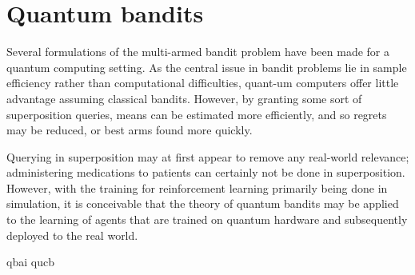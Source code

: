 \chapter{Quantum bandits}
\label{chap:qbandits}

Several formulations of the multi-armed bandit problem have been made for a quantum computing setting.
As the central issue in bandit problems lie in sample efficiency rather than computational difficulties, quant-um computers offer little advantage assuming classical bandits.
However, by granting some sort of superposition queries, means can be estimated more efficiently, and so regrets may be reduced, or best arms found more quickly.

Querying in superposition may at first appear to remove any real-world relevance; administering medications to patients can certainly not be done in superposition.
However, with the training for reinforcement learning primarily being done in simulation, it is conceivable that the theory of quantum bandits may be applied to the learning of agents that are trained on quantum hardware and subsequently deployed to the real world.

{qbai}
{qucb}